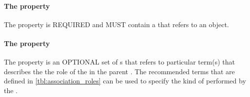 \paragraph{The  property}\label{sec:agent}
The  property is REQUIRED and MUST contain a  that refers to an  object.

\paragraph{The  property}\label{sec:roles:A}
The  property is an OPTIONAL set of s that refers to particular term(s) that describes the the role of the  in the parent . 
The recommended terms that are defined in \ref{tbl:association_roles} can be used to specify the kind of  performed by the .

